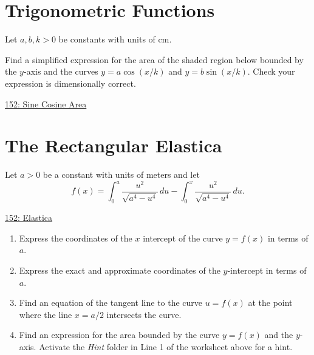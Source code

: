 \documentclass{ximera}
\begin{document}
\section{Trigonometric Functions}

\begin{question} \label{QLkfeREdfd}
Let $a,b,k>0$ be constants with units of cm.

Find a simplified expression for the area of the shaded region below bounded by the $y$-axis and the curves $y=a\cos (x/k)$ and $y=b\sin (x/k)$. Check your expression is dimensionally correct.

\begin{onlineOnly}
    \begin{center}
\end{center}
\end{onlineOnly}

\href{https://www.desmos.com/calculator/ps1m0hksl0}{152: Sine Cosine Area}
\end{question}


\section{The Rectangular Elastica}

Let $a>0$ be a constant with units of meters and let
\[
   f(x) = \int_0^a \frac{u^2}{\sqrt{a^4-u^4}} \, du - \int_0^x \frac{u^2}{\sqrt{a^4-u^4}} \, du .
\]

\begin{question} \label{QKDFeefrfr3}

\begin{onlineOnly}
    \begin{center}
\end{center}
\end{onlineOnly}

\href{https://www.desmos.com/calculator/c3vderglut}{152: Elastica}

\begin{enumerate}

\item Express the coordinates of the $x$ intercept of the curve $y=f(x)$ in terms of $a$.

\item Express the exact and approximate coordinates of the $y$-intercept in terms of $a$.

\item Find an equation of the tangent line to the curve $u=f(x)$ at the point where the line $x=a/2$ intersects the curve.

\item Find an expression for the area bounded by the curve $y=f(x)$ and the $y$-axis. Activate the \emph{Hint} folder in Line 1 of the worksheet above for a hint. 

\end{enumerate}

\end{question}
\end{document}
